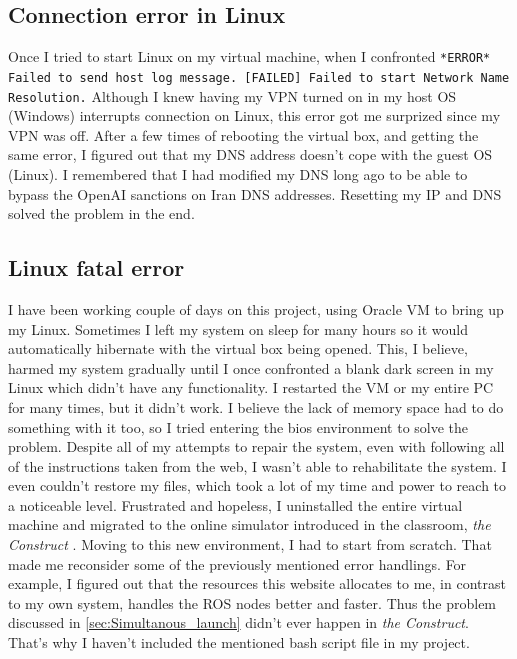 \documentclass[conference]{IEEEtran}
\newcommand{\error}[1]{\textcolor{red!75!black}{\footnotesize \texttt{#1}}}
\begin{document}
\subsection{Connection error in Linux}
\label{sec:Connection_error}
Once I tried to start Linux on my virtual machine, when I confronted \error{*ERROR* Failed to send host log message.
        [FAILED] Failed to start Network Name Resolution.} Although I knew having my VPN turned on in my host OS (Windows) interrupts connection on Linux, this error got me surprized since my VPN was off. After a few times of rebooting the virtual box, and getting the same error, I figured out that my DNS address doesn't cope with the guest OS (Linux). I remembered that I had modified my DNS long ago to be able to bypass the OpenAI \cite{b2} sanctions on Iran DNS addresses. Resetting my IP and DNS solved the problem in the end.
\vspace{10px}


\subsection{Linux fatal error}
\label{sec:Linux_fatal}
I have been working couple of days on this project, using Oracle VM to bring up my Linux. Sometimes I left my system on sleep for many hours so it would automatically hibernate with the virtual box being opened. This, I believe, harmed my system gradually until I once confronted a blank dark screen in my Linux which didn't have any functionality. I restarted the VM or my entire PC for many times, but it didn't work. I believe the lack of memory space had to do something with it too, so I tried entering the bios environment to solve the problem. Despite all of my attempts to repair the system, even with following all of the instructions taken from the web, I wasn't able to rehabilitate the system. I even couldn't restore my files, which took a lot of my time and power to reach to a noticeable level. Frustrated and hopeless, I uninstalled the entire virtual machine and migrated to the online simulator introduced in the classroom, \textit{the Construct} \cite{b4}. Moving to this new environment, I had to start from scratch. That made me reconsider some of the previously mentioned error handlings. For example, I figured out that the resources this website allocates to me, in contrast to my own system, handles the ROS nodes better and faster. Thus the problem discussed in \ref{sec:Simultanous_launch} didn't ever happen in \textit{the Construct}. That's why I haven't included the mentioned bash script file in my project.
\vspace{10px}
\end{document}
